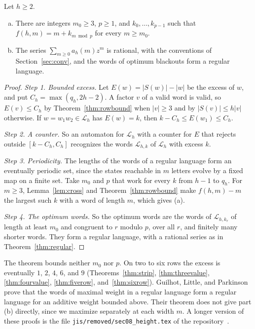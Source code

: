 \begin{theorem}\label{thm:periodic}
Let $h\ge2$.
\begin{enumerate}[(a)]
\item There are integers $m_0\ge3$, $p\ge1$, and $k_0,\dots,k_{p-1}$ such that $f(h,m)=m+k_{m\bmod p}$ for every $m\ge m_0$.
\item The series $\sum_{m\ge0}a_h(m)z^m$ is rational, with the conventions of Section~\ref{sec:conv}, and the words of optimum blackouts form a regular language.

\end{enumerate}
\end{theorem}

\begin{proof}
\emph{Step 1. Bounded excess.} Let $E(w)=|S(w)|-|w|$ be the excess of $w$, and put $C_h=\max(q_h,2h-2)$. A factor $v$ of a valid word is valid, so $E(v)\le C_h$ by Theorem~\ref{thm:rowbound} when $|v|\ge3$ and by $|S(v)|\le h|v|$ otherwise. If $w=w_1w_2\in\mathcal L_h$ has $E(w)=k$, then $k-C_h\le E(w_1)\le C_h$.

\emph{Step 2. A counter.} So an automaton for $\mathcal L_h$ with a counter for $E$ that rejects outside $[k-C_h,C_h]$ recognizes the words $\mathcal L_{h,k}$ of $\mathcal L_h$ with excess $k$.

\emph{Step 3. Periodicity.} The lengths of the words of a regular language form an eventually periodic set, since the states reachable in $m$ letters evolve by a fixed map on a finite set. Take $m_0$ and $p$ that work for every $k$ from $h-1$ to $q_h$. For $m\ge3$, Lemma~\ref{lem:cross} and Theorem~\ref{thm:rowbound} make $f(h,m)-m$ the largest such $k$ with a word of length $m$, which gives (a).

\emph{Step 4. The optimum words.} So the optimum words are the words of $\mathcal L_{h,k_r}$ of length at least $m_0$ and congruent to $r$ modulo $p$, over all $r$, and finitely many shorter words. They form a regular language, with a rational series as in Theorem~\ref{thm:regular}.
\end{proof}

The theorem bounds neither $m_0$ nor $p$. On two to six rows the excess is eventually $1$, $2$, $4$, $6$, and $9$ (Theorems~\ref{thm:strip}, \ref{thm:threevalue}, \ref{thm:fourvalue}, \ref{thm:fiverow}, and~\ref{thm:sixrow}). Guilhot, Little, and Parkinson \cite[Theorem~1(3)]{glp2025} prove that the words of maximal weight in a regular language form a regular language for an additive weight bounded above. Their theorem does not give part (b) directly, since we maximize separately at each width $m$. A longer version of these proofs is the file \nolinkurl{jis/removed/sec08_height.tex} of the repository~\cite{repo}.

